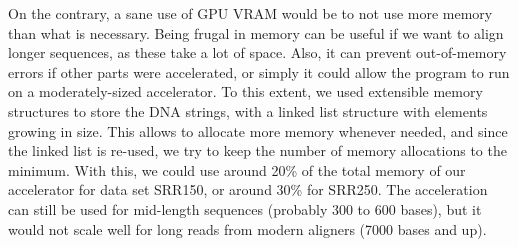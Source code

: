 On the contrary, a sane use of GPU VRAM would be to not use more memory than what is necessary. Being frugal in memory can be useful if we want to align longer sequences, as these take a lot of space. Also, it can prevent out-of-memory errors if other parts were accelerated, or simply it could allow the program to run on a moderately-sized accelerator. To this extent, we used extensible memory structures to store the DNA strings, with a linked list structure with elements growing in size. This allows to allocate more memory whenever needed, and since the linked list is re-used, we try to keep the number of memory allocations to the minimum. With this, we could use around 20\% of the total memory of our accelerator for data set SRR150, or around 30\% for SRR250. The acceleration can still be used for mid-length sequences (probably 300 to 600 bases), but it would not scale well for long reads from modern aligners (7000 bases and up).

